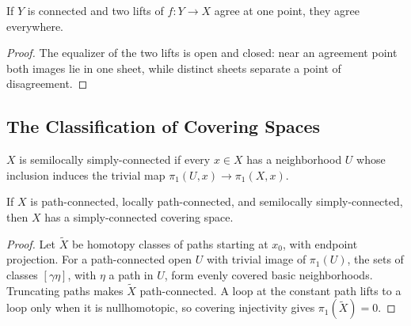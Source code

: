 \begin{proposition}
\label{prop:covering-unique-lifting}
\leanok
{}
If $Y$ is connected and two lifts of $f:Y\to X$ agree at one point, they agree
everywhere.
\end{proposition}

\begin{proof}
\leanok
\sketch The equalizer of the two lifts is open and closed: near an agreement
point both images lie in one sheet, while distinct sheets separate a point of
disagreement.
\end{proof}

\subsection*{The Classification of Covering Spaces}

\begin{definition}
\label{def:semilocally-simply-connected}
\leanok
{}
$X$ is semilocally simply-connected if every $x\in X$ has a neighborhood $U$
whose inclusion induces the trivial map $\pi_1(U,x)\to\pi_1(X,x)$.
\end{definition}

\begin{proposition}
\label{prop:universal-cover-construction}
\leanok
{}
If $X$ is path-connected, locally path-connected, and semilocally
simply-connected, then $X$ has a simply-connected covering space.
\end{proposition}

\begin{proof}
\leanok
\sketch Let $\widetilde X$ be homotopy classes of paths starting at $x_0$,
with endpoint projection. For a path-connected open $U$ with trivial image of
$\pi_1(U)$, the sets of classes $[\gamma\eta]$, with $\eta$ a path in $U$,
form evenly covered basic neighborhoods. Truncating paths makes
$\widetilde X$ path-connected. A loop at the constant path lifts to a loop
only when it is nullhomotopic, so covering injectivity gives
$\pi_1(\widetilde X)=0$.
\end{proof}


